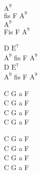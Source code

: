 \begin{chord}
    $\mathrm{A^9}$\\
    fis F $\mathrm{A^9}$\\
    $\mathrm{A^9}$\\
    Fis F $\mathrm{A^9}$

    D $\mathrm{E^7}$\\
    $\mathrm{A^9}$ fis F $\mathrm{A^9}$\\
    D $\mathrm{E^7}$\\
    $\mathrm{A^9}$ fis F $\mathrm{A^9}$

    C G a F\\
    C G a F\\
    C G a F\\
    C G a F

    C G a F\\
    C G a F\\
    C G a F\\
    C G a F
\end{chord}
